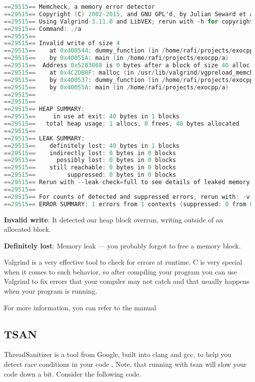 \begin{lstlisting}[language=C]
==29515== Memcheck, a memory error detector
==29515== Copyright (C) 2002-2015, and GNU GPL'd, by Julian Seward et al.
==29515== Using Valgrind-3.11.0 and LibVEX; rerun with -h for copyright info
==29515== Command: ./a
==29515==
==29515== Invalid write of size 4
==29515==    at 0x400544: dummy_function (in /home/rafi/projects/exocpp/a)
==29515==    by 0x40055A: main (in /home/rafi/projects/exocpp/a)
==29515==  Address 0x5203068 is 0 bytes after a block of size 40 alloc'd
==29515==    at 0x4C2DB8F: malloc (in /usr/lib/valgrind/vgpreload_memcheck-amd64-linux.so)
==29515==    by 0x400537: dummy_function (in /home/rafi/projects/exocpp/a)
==29515==    by 0x40055A: main (in /home/rafi/projects/exocpp/a)
==29515==
==29515==
==29515== HEAP SUMMARY:
==29515==     in use at exit: 40 bytes in 1 blocks
==29515==   total heap usage: 1 allocs, 0 frees, 40 bytes allocated
==29515==
==29515== LEAK SUMMARY:
==29515==    definitely lost: 40 bytes in 1 blocks
==29515==    indirectly lost: 0 bytes in 0 blocks
==29515==      possibly lost: 0 bytes in 0 blocks
==29515==    still reachable: 0 bytes in 0 blocks
==29515==         suppressed: 0 bytes in 0 blocks
==29515== Rerun with --leak-check=full to see details of leaked memory
==29515==
==29515== For counts of detected and suppressed errors, rerun with: -v
==29515== ERROR SUMMARY: 1 errors from 1 contexts (suppressed: 0 from 0)
\end{lstlisting}

\textbf{Invalid write}: It detected our heap block overrun, writing outside of an allocated block.

\textbf{Definitely lost}: Memory leak --- you probably forgot to free a memory block.

Valgrind is a very effective tool to check for errors at runtime. C is very special when it comes to such behavior, so after compiling your program you can use Valgrind to fix errors that your compiler may not catch and that usually happens when your program is running.

For more information, you can refer to the manual \cite{valgrind}

\subsection{TSAN}

ThreadSanitizer is a tool from Google, built into clang and gcc, to help you detect race conditions in your code \cite{threadsanitizercppmanual_2018}.
Note, that running with tsan will slow your code down a bit. Consider the following code.

